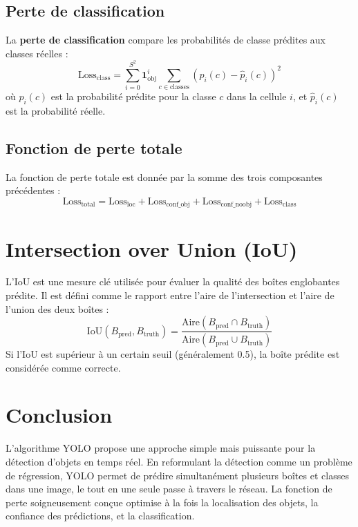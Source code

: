 \documentclass[a4paper,12pt]{article}
\begin{document}
\subsection{Perte de classification}
La \textbf{perte de classification} compare les probabilités de classe prédites aux classes réelles :
\[
\text{Loss}_{\text{class}} = \sum_{i=0}^{S^2} \mathbf{1}_{\text{obj}}^{i} \sum_{c \in \text{classes}} (p_i(c) - \hat{p}_i(c))^2
\]
où $p_i(c)$ est la probabilité prédite pour la classe $c$ dans la cellule $i$, et $\hat{p}_i(c)$ est la probabilité réelle.

\subsection{Fonction de perte totale}
La fonction de perte totale est donnée par la somme des trois composantes précédentes :
\[
\text{Loss}_{\text{total}} = \text{Loss}_{\text{loc}} + \text{Loss}_{\text{conf\_obj}} + \text{Loss}_{\text{conf\_noobj}} + \text{Loss}_{\text{class}}
\]

\section{Intersection over Union (IoU)}
L'IoU est une mesure clé utilisée pour évaluer la qualité des boîtes englobantes prédite. Il est défini comme le rapport entre l'aire de l'intersection et l'aire de l'union des deux boîtes :
\[
\text{IoU}(B_{\text{pred}}, B_{\text{truth}}) = \frac{\text{Aire}(B_{\text{pred}} \cap B_{\text{truth}})}{\text{Aire}(B_{\text{pred}} \cup B_{\text{truth}})}
\]
Si l'IoU est supérieur à un certain seuil (généralement 0.5), la boîte prédite est considérée comme correcte.

\section{Conclusion}
L'algorithme YOLO propose une approche simple mais puissante pour la détection d'objets en temps réel. En reformulant la détection comme un problème de régression, YOLO permet de prédire simultanément plusieurs boîtes et classes dans une image, le tout en une seule passe à travers le réseau. La fonction de perte soigneusement conçue optimise à la fois la localisation des objets, la confiance des prédictions, et la classification.
\end{document}
